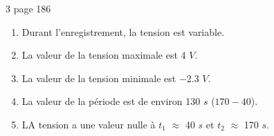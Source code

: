 \begin{myact}{3 page 186}
	\begin{enumerate}
		\item Durant l'enregistrement, la tension est variable.\pause
		\item La valeur de la tension maximale est \num{4} $V$.
		\item La valeur de la tension minimale est \num{-2.3} $V$.
		\item La valeur de la période est de environ \num{130} $s$ ($170 - 40$).
		\item LA tension a une valeur nulle à $t_1$ $\approx$ 40 $s$ et $t_2$ $\approx$ 170 $s$.
		
	\end{enumerate}
\end{myact}